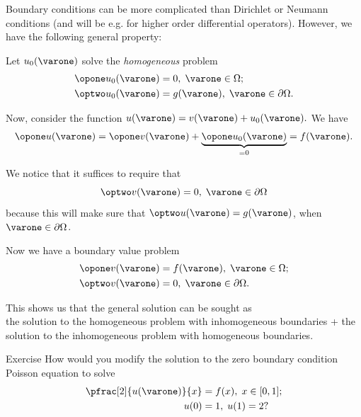 \begin{frame}
	Boundary conditions can be more complicated than Dirichlet or Neumann conditions (and will be e.g. for higher order differential operators). However, we have the following general property:
	
	Let $ u_0(\varone) $ solve the \emph{homogeneous} problem
	\[ \begin{split}
		\opone u_0(\varone) &= 0, \; \varone \in \Omega; \\ 
		\optwo u_0(\varone) &= g(\varone), \; \varone \in \partial \Omega.
	\end{split} \]
	
	Now, consider the function $ u(\varone) = v(\varone) + u_0(\varone). $ We have 
	\[ \opone u(\varone) = \opone v(\varone) + \underbrace{\opone u_0 (\varone)}_{=0} = f(\varone). \]
	
	We notice that it suffices to require that 
	\[ \optwo v(\varone) = 0,\; \varone \in \partial \Omega \]
	 because this will make sure that $ \optwo u(\varone) = g(\varone) $, when $ \varone \in \partial \Omega $.
\end{frame}

\begin{frame}
	Now we have a boundary value problem 
	\[ \begin{split}
		\opone v(\varone) &= f(\varone), \; \varone \in \Omega; \\ 
		\optwo v(\varone) &= 0, \; \varone \in \partial \Omega.
	\end{split} \]

	This shows us that the general solution can be sought as \\ \alert{the solution to the homogeneous problem with inhomogeneous boundaries} + \alert{the solution to the inhomogeneous problem with homogeneous boundaries}.
\end{frame}

\begin{frame}{Exercise \exercisen}
	How would you modify the solution to the zero boundary condition Poisson equation to solve
	\[ \begin{split}
		\pfrac[2]{u(\varone)}{x} &= f(x),\; x\in [0,1]; \\
		u(0)&=1,\; u(1) = 2?
	\end{split} \]
\end{frame}

